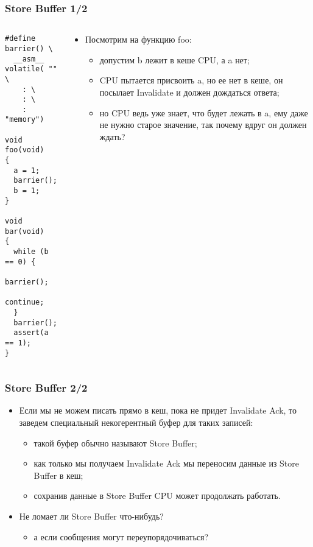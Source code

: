 \begin{frame}[fragile]
\frametitle{Store Buffer 1/2}
\begin{columns}
  \begin{column}{0.3\linewidth}
    \begin{lstlisting}
#define barrier() \
  __asm__ volatile( "" \
	: \
	: \
	: "memory")

void foo(void)
{
  a = 1;
  barrier();
  b = 1;
}

void bar(void)
{
  while (b == 0) {
    barrier();
    continue;
  }
  barrier();
  assert(a == 1);
}
    \end{lstlisting}
  \end{column}
  \begin{column}{0.8\linewidth}
  \begin{itemize}
    \item Посмотрим на функцию foo:
    \begin{itemize}
      \item допустим b лежит в кеше CPU, а a нет;
      \item CPU пытается присвоить a, но ее нет в кеше, он посылает Invalidate и
      должен дождаться ответа;
      \item но CPU ведь уже знает, что будет лежать в a, ему даже не нужно
      старое значение, так почему вдруг он должен ждать?
    \end{itemize}
  \end{itemize}
  \end{column}
\end{columns}
\end{frame}

\begin{frame}
\frametitle{Store Buffer 2/2}
\begin{itemize}
  \item Если мы не можем писать прямо в кеш, пока не придет Invalidate Ack, то
  заведем специальный некогерентный буфер для таких записей:
  \begin{itemize}
    \item такой буфер обычно называют Store Buffer;
    \item как только мы получаем Invalidate Ack мы переносим данные из Store
    Buffer в кеш;
    \item сохранив данные в Store Buffer CPU может продолжать работать.
  \end{itemize}
  \item Не ломает ли Store Buffer что-нибудь?
  \begin{itemize}
    \item а если сообщения могут переупорядочиваться?
  \end{itemize}
\end{itemize}
\end{frame}

